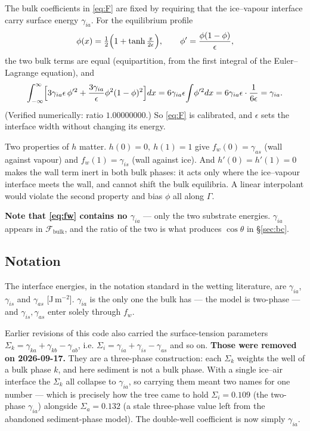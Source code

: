 \documentclass[11pt,a4paper]{article}
\newcommand{\sia}{\gamma_{ia}}
\newcommand{\sis}{\gamma_{is}}
\newcommand{\sas}{\gamma_{as}}
\newcommand{\eps}{\epsilon}
\begin{document}
The bulk coefficients in \eqref{eq:F} are fixed by requiring that the ice--vapour
interface carry surface energy $\sia$. For the equilibrium profile
\begin{equation}
\phi(x)=\tfrac12\Bigl(1+\tanh\tfrac{x}{2\eps}\Bigr),
\qquad
\phi'=\frac{\phi(1-\phi)}{\eps},
\label{eq:profile}
\end{equation}
the two bulk terms are equal (equipartition, from the first integral of the
Euler--Lagrange equation), and
\begin{equation}
\int_{-\infty}^{\infty}\Bigl[3\sia\eps\,\phi'^{2}+\frac{3\sia}{\eps}\phi^{2}(1-\phi)^{2}\Bigr]dx
=6\sia\eps\!\int\!\phi'^{2}dx
=6\sia\eps\cdot\frac{1}{6\eps}
=\sia .
\label{eq:excess}
\end{equation}
(Verified numerically: ratio $1.00000000$.) So \eqref{eq:F} is calibrated, and
$\eps$ sets the interface width without changing its energy.

Two properties of $h$ matter. $h(0)=0,\ h(1)=1$ give $f_w(0)=\sas$ (wall against
vapour) and $f_w(1)=\sis$ (wall against ice). And $h'(0)=h'(1)=0$ makes the wall
term inert in both bulk phases: it acts only where the ice--vapour interface
meets the wall, and cannot shift the bulk equilibria. A linear interpolant would
violate the second property and bias $\phi$ all along $\Gamma$.

\textbf{Note that \eqref{eq:fw} contains no $\sia$} --- only the two substrate
energies. $\sia$ appears in $\mathcal{F}_{\text{bulk}}$, and the ratio of the two
is what produces $\cos\theta$ in \S\ref{sec:bc}.

\subsection{Notation}

The interface energies, in the notation standard in the wetting literature, are $\sia$, $\sis$ and $\sas$
[J\,m$^{-2}$]. $\sia$ is the only one the bulk has --- the model is two-phase ---
and $\sis,\sas$ enter solely through $f_w$.

Earlier revisions of this code also carried the surface-tension parameters
$\Sigma_k=\gamma_{ka}+\gamma_{kb}-\gamma_{ab}$, i.e.
$\Sigma_i=\sia+\sis-\sas$ and so on. \textbf{Those were removed on
2026-09-17.} They are a three-phase construction: each $\Sigma_k$ weights the
well of a bulk phase $k$, and here sediment is not a bulk phase. With a single
ice--air interface the $\Sigma_k$ all collapse to $\sia$, so carrying them meant
two names for one number --- which is precisely how the tree came to hold
$\Sigma_i=0.109$ (the two-phase $\sia$) alongside $\Sigma_a=0.132$ (a stale
three-phase value left from the abandoned sediment-phase model). The double-well
coefficient is now simply $\sia$.
\end{document}
